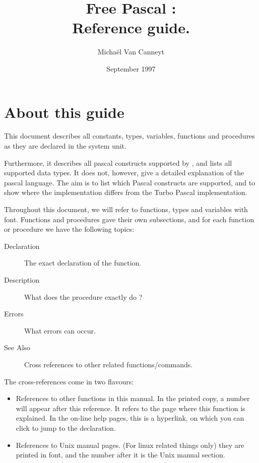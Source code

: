 \documentclass{report}
\begin{document}
\title{Free Pascal :\\ Reference guide.}
\date{September 1997}
\author{Micha\"el Van Canneyt
}
\maketitle
\tableofcontents
\newpage
\listoftables
\newpage
\section*{About this guide}
This document describes all constants, types, variables, functions and
procedures as they are declared in the system unit.

Furthermore, it describes all pascal constructs supported by \fpc, and lists
all supported data types. It does not, however, give a detailed explanation
of the pascal language. The aim is to list which Pascal constructs are
supported, and to show where the \fpc implementation differs from the
Turbo Pascal implementation.

Throughout this document, we will refer to functions, types and variables
with  font. Functions and procedures gave their own
subsections, and for each function or procedure we have the following 
topics:
\begin{description}
\item [Declaration] The exact declaration of the function.
\item [Description] What does the procedure exactly do ?
\item [Errors] What errors can occur.
\item [See Also] Cross references to other related functions/commands.
\end{description}
The cross-references come in two flavours:
\begin{itemize}
\item References to other functions in this manual. In the printed copy, a
number will appear after this reference. It refers to the page where this
function is explained. In the on-line help pages, this is a hyperlink, on
which you can click to jump to the declaration.
\item References to Unix manual pages. (For linux related things only) they
are printed in  font, and the number after it is the Unix
manual section.
\end{itemize}
%
%
\end{document}
